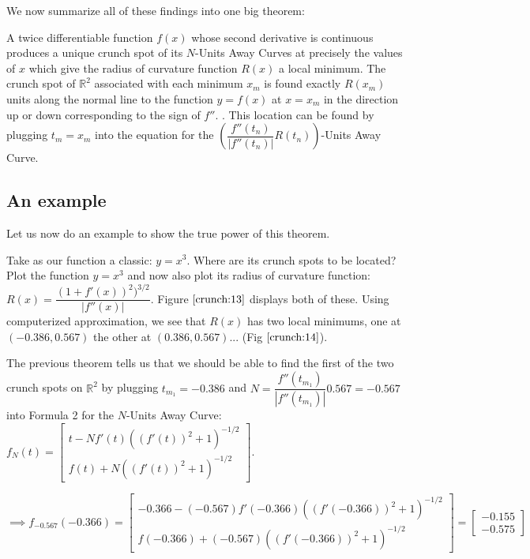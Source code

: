 We now summarize all of these findings into one big theorem:

\begin{theorem}

  A twice differentiable function $f(x)$ whose second derivative is continuous produces a unique crunch spot of its $N$-Units Away Curves at precisely the values of $x$ which give the radius of curvature function $R(x)$ a local minimum. The crunch spot of $\mathbb{R}^2$ associated with each minimum $x_m$ is found exactly $R(x_m)$ units along the normal line to the function $y = f(x)$ at $x = x_m$ in the direction up or down corresponding to the sign of $f''$. . This location can be found by plugging $t_m = x_m$ into the equation for the $\left( \dfrac{f''(t_n)}{|f''(t_n)|} R(t_n) \right)$-Units Away Curve.

\end{theorem}

\subsection{An example}

Let us now do an example to show the true power of this theorem.

\figuresV

Take as our function a classic: $y = x^3$. Where are its crunch spots to be located? Plot the function $y = x^3$ and now also plot its radius of curvature function: $R(x) = \dfrac{(1 + f'(x))^2)^{3/2}}{|f''(x)|}$. Figure $\ref{crunch:13}$ displays both of these. Using computerized approximation, we see that $R(x)$ has two local minimums, one at $(-0.386, 0.567)$ the other at $(0.386, 0.567)$... (Fig $\ref{crunch:14}$).

The previous theorem tells us that we should be able to find the first of the two crunch spots on $\mathbb{R}^2$ by plugging $t_{m_1} = -0.386$ and $ N = \dfrac{f''(t_{m_1})}{|f''(t_{m_1})|} 0.567 = -0.567 $ into Formula 2 for the $N$-Units Away Curve: $ f_N(t) =
\begin{bmatrix}
  t - N f'(t) ((f'(t))^2 + 1)^{-1/2} \\
  f(t) + N ((f'(t))^2 + 1)^{-1/2}
\end{bmatrix} $.

\newcommand\N{}
\newcommand\temp{}

\begin{center}
  \renewcommand\N{-0.567}
  \renewcommand\temp{-0.366}
  $
  \implies
  f_{\N}(\temp) =
  \begin{bmatrix}
    \temp - (\N) f'(\temp) ((f'(\temp))^2 + 1)^{-1/2} \\
    f(\temp) + (\N) ((f'(\temp))^2 + 1)^{-1/2}
  \end{bmatrix} =
  \begin{bmatrix}
    -0.155 \\
    -0.575
  \end{bmatrix}
  $
\end{center}

